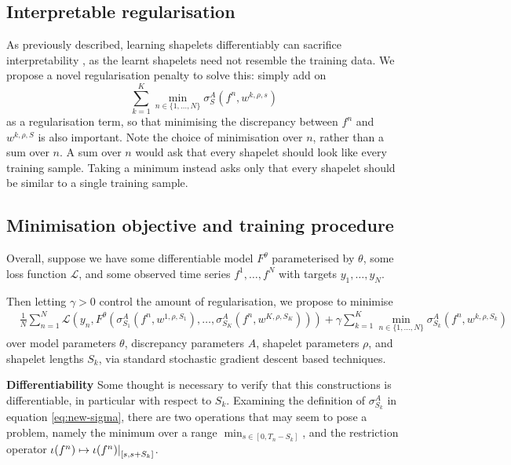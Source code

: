 \documentclass{article}
\theoremstyle{plain}
\theoremstyle{definition}
\newcommand{\restr}[2]{{\left.\kern-\nulldelimiterspace #1 \right|_{#2}}}
\newcommand{\boldheading}[1]{

\textbf{#1}\quad}
\begin{document}
	\subsection{Interpretable regularisation}
	As previously described, learning shapelets differentiably can sacrifice interpretability \cite{wang2019interp}, as the learnt shapelets need not resemble the training data. We propose a novel regularisation penalty to solve this: simply add on
	\begin{equation}
		\label{eq:interpretable_reg}
		\sum_{k = 1}^K \min_{n \in \{1, \ldots, N\}} \sigma^A_S(f^n, w^{k, \rho, s})
	\end{equation}
	as a regularisation term, so that minimising the discrepancy between $f^n$ and $w^{k, \rho, S}$ is also important. Note the choice of minimisation over $n$, rather than a sum over $n$. A sum over $n$ would ask that every shapelet should look like every training sample. Taking a minimum instead asks only that every shapelet should be similar to a single training sample.
	
	\subsection{Minimisation objective and training procedure}
	Overall, suppose we have some differentiable model $F^\theta$ parameterised by $\theta$, some loss function $\mathcal{L}$, and some observed time series $f^1, \ldots, f^N$ with targets $y_1, \ldots, y_N$.	
	
	Then letting $\gamma > 0$ control the amount of regularisation, we propose to minimise
	\newcommand{\objective}{&\frac{1}{N}\sum_{n = 1}^N \mathcal{L}(y_n, F^\theta(\sigma^A_{S_1}(f^n, w^{1, \rho, S_1}), \ldots, \sigma^A_{S_K}(f^n, w^{K, \rho, S_K}))) + \gamma \sum_{k = 1}^K \min_{n \in \{1, \ldots, N\}} \sigma^A_{S_k}(f^n, w^{k, \rho, S_k})}
	\begin{align}
	\objective \label{eq:objective}
	\end{align}
	over model parameters $\theta$, discrepancy parameters $A$, shapelet parameters $\rho$, and shapelet lengths $S_k$, via standard stochastic gradient descent based techniques.

	\boldheading{Differentiability}
	Some thought is necessary to verify that this constructions is differentiable, in particular with respect to $S_k$. Examining the definition of $\sigma^A_{S_k}$ in equation \eqref{eq:new-sigma}, there are two operations that may seem to pose a problem, namely the minimum over a range $\min_{s \in [0, T_n - S_k]}$, and the restriction operator $\iota(f^n) \mapsto \restr{\iota(f^n)}{[s, s + S_k]}$.
\end{document}
